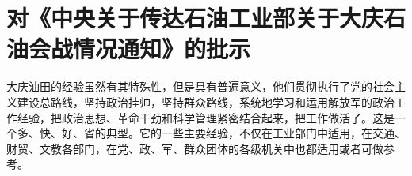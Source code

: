 \section[对《中央关于传达石油工业部关于大庆石油会战情况通知》的批示（一九六四年二月五日）]{对《中央关于传达石油工业部关于大庆石油会战情况通知》的批示}


大庆油田的经验虽然有其特殊性，但是具有普遍意义，他们贯彻执行了党的社会主义建设总路线，坚持政治挂帅，坚持群众路线，系统地学习和运用解放军的政治工作经验，把政治思想、革命干劲和科学管理紧密结合起来，把工作做活了。这是一个多、快、好、省的典型。它的一些主要经验，不仅在工业部门中适用，在交通、财贸、文教各部门，在党、政、军、群众团体的各级机关中也都适用或者可做参考。

